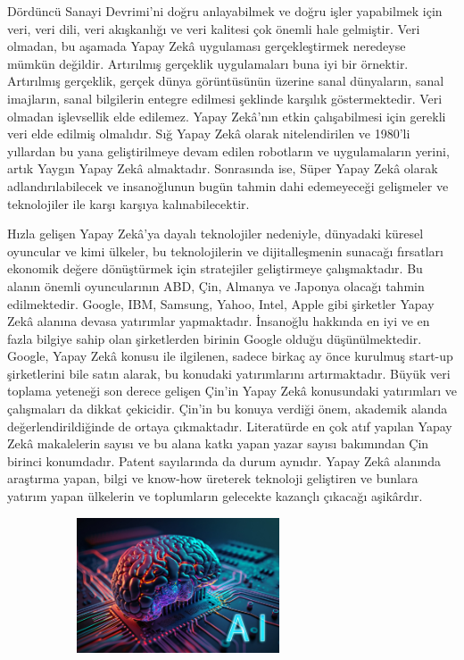 \documentclass{article}
\begin{document}
\newpage
\begin{multicols}{2}

Dördüncü Sanayi Devrimi’ni doğru anlayabilmek ve doğru işler
yapabilmek için veri, veri dili, veri akışkanlığı ve veri kalitesi çok önemli hale gelmiştir. Veri olmadan, bu aşamada Yapay Zekâ uygulaması gerçekleştirmek neredeyse mümkün değildir. Artırılmış gerçeklik uygulamaları buna iyi bir örnektir. Artırılmış gerçeklik, gerçek dünya görüntüsünün üzerine sanal dünyaların, sanal imajların, sanal bilgilerin entegre edilmesi şeklinde karşılık göstermektedir. Veri
olmadan işlevsellik elde edilemez. Yapay Zekâ’nın etkin çalışabilmesi için gerekli veri elde edilmiş olmalıdır. Sığ Yapay Zekâ olarak nitelendirilen ve 1980’li yıllardan bu yana geliştirilmeye devam edilen robotların ve uygulamaların yerini,
artık Yaygın Yapay Zekâ almaktadır. Sonrasında ise, Süper Yapay Zekâ olarak
adlandırılabilecek ve insanoğlunun bugün tahmin dahi edemeyeceği gelişmeler
ve teknolojiler ile karşı karşıya kalınabilecektir.

Hızla gelişen Yapay Zekâ’ya dayalı teknolojiler nedeniyle, dünyadaki küresel
oyuncular ve kimi ülkeler, bu teknolojilerin ve dijitalleşmenin sunacağı fırsatları ekonomik değere dönüştürmek için stratejiler geliştirmeye çalışmaktadır. Bu
alanın önemli oyuncularının ABD, Çin, Almanya ve Japonya olacağı tahmin edilmektedir. Google, IBM, Samsung, Yahoo, Intel, Apple gibi şirketler Yapay Zekâ
alanına devasa yatırımlar yapmaktadır. İnsanoğlu hakkında en iyi ve en fazla
bilgiye sahip olan şirketlerden birinin Google olduğu düşünülmektedir. Google,
Yapay Zekâ konusu ile ilgilenen, sadece birkaç ay önce kurulmuş start-up şirketlerini bile satın alarak, bu konudaki yatırımlarını artırmaktadır. Büyük veri toplama yeteneği son derece gelişen Çin’in Yapay Zekâ konusundaki yatırımları ve
çalışmaları da dikkat çekicidir. Çin’in bu konuya verdiği önem, akademik alanda
değerlendirildiğinde de ortaya çıkmaktadır. Literatürde en çok atıf yapılan Yapay Zekâ makalelerin sayısı ve bu alana katkı yapan yazar sayısı bakımından Çin
birinci konumdadır. Patent sayılarında da durum aynıdır. Yapay Zekâ alanında
araştırma yapan, bilgi ve know-how üreterek teknoloji geliştiren ve bunlara yatırım yapan ülkelerin ve toplumların gelecekte kazançlı çıkacağı aşikârdır.
\end{multicols}
\begin{figure}[h]
\centering
  \includegraphics[width=8cm, height=4cm]{1.jpeg}
  \caption{\cite{ref3}}
\end{figure}
\newpage
\end{document}
